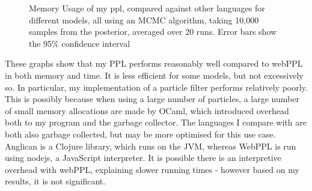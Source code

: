 \begin{figure}[!ht]
	\centering
	\caption{Memory Usage of my ppl, compared against other languages for different models, all using an MCMC algorithm, taking 10,000 samples from the posterior, averaged over 20 runs. Error bars show the 95\% confidence interval}
	\label{fig:mem-perf}
\end{figure}

These graphs show that my PPL performs reasonably well compared to webPPL in both memory and time. It is less efficient for some models, but not excessively so. In particular, my implementation of a particle filter performs relatively poorly. This is possibly because when using a large number of particles, a large number of small memory allocations are made by OCaml, which introduced overhead both to my program and the garbage collector. The languages I compare with are both also garbage collected, but may be more optimised for this use case. Anglican is a Clojure library, which runs on the JVM, whereas WebPPL is run using nodejs, a JavaScript interpreter. It is possible there is an interpretive overhead with webPPL, explaining slower running times - however based on my results, it is not significant.


